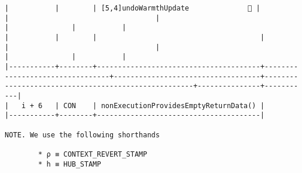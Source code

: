 \documentclass[varwidth=\maxdimen,margin=0.5cm,multi={verbatim}]{standalone}
\begin{document}
\begin{verbatim}
|           |        | [5,4]undoWarmthUpdate              👋 |                                 |                                   |                                                     |               |           |
|           |        |                                       |                                 |                                   |                                                     |               |           |
|-----------+--------+---------------------------------------+---------------------------------+-----------------------------------+-----------------------------------------------------+---------------+-----------|
|   i + 6   | CON    | nonExecutionProvidesEmptyReturnData() |
|-----------+--------+---------------------------------------|

NOTE. We use the following shorthands

        * ρ ≡ CONTEXT_REVERT_STAMP
        * h ≡ HUB_STAMP

\end{verbatim}
\end{document}

